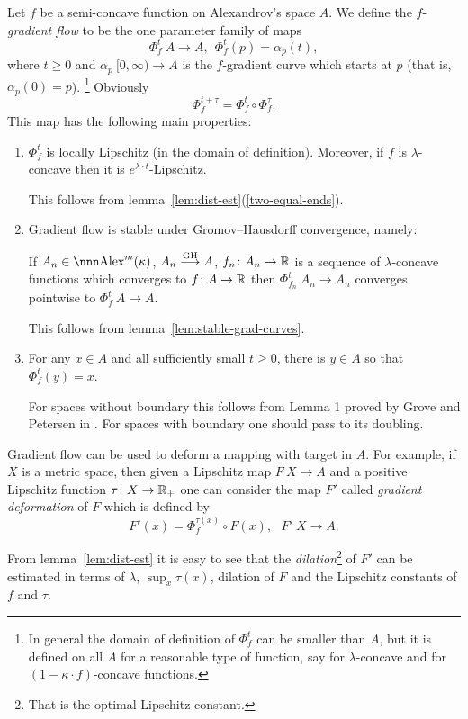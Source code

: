 \documentclass{article}
\begin{document}
Let $f$ be a semi-concave function on Alexandrov's space $A$. 
We define the $f$-\emph{gradient flow} to be the one parameter family of maps 
$$\Phi^t_f\:A\to A, \ \ \Phi^t_f(p)=\alpha_p(t),$$
where $t\ge 0$ and $\alpha_p\:[0,\infty)\to A$ is the $f$-gradient curve which
starts at $p$ (that is, $\alpha_p(0)=p$).
\footnote{In general the domain of definition of $\Phi^t_f$ can be smaller than $A$, 
but it is defined on all $A$ for a reasonable type of function, say for $\lambda$-concave and for $(1-\kappa{\cdot}f)$-concave functions.}
Obviously
$$ \Phi^{t+\tau}_f=\Phi^t_f\circ\Phi^\tau_f.$$
This map has the following main properties:
\begin{enumerate}
\item $\Phi^t_f$ is locally Lipschitz (in the domain of definition). 
Moreover, if $f$ is $\lambda$-concave then it is $e^{\lambda{\cdot}t}$-Lipschitz.

This follows from lemma~\ref{lem:dist-est}(\ref{two-equal-ends}).

\item Gradient flow is stable under Gromov--Hausdorff convergence, namely:

If $A_n\in \Alex^m(\kappa)$, $A_n\GHto A$, $f_n\colon A_n\to\mathbb{R}$ is a sequence of
$\lambda$-concave functions which converges to $f\colon A\to \mathbb{R}$ then
$\Phi_{f_n}^t\:A_n\to A_n$ converges pointwise to $\Phi_f^t\:A\to A$.

This follows  from lemma~\ref{lem:stable-grad-curves}.

\item\label{grad-onto} For any $x\in A$ and all sufficiently small $t\ge 0$, there is $y\in A$ so that 
$\Phi_f^t(y)=x$.

For spaces without boundary this follows from Lemma 1 proved by Grove and Petersen in \cite{grove-petersen:rad-sphere}.
For spaces with boundary one should pass to its doubling.
\end{enumerate}


Gradient flow can be used to deform a mapping with target in $A$. 
For example, if $X$ is a metric space, then given a Lipschitz map $F\:X\to A$ and
a positive Lipschitz function $\tau\colon X\to \mathbb{R}_+$ one can consider the map $F'$ called
\emph{gradient deformation} of $F$ which is defined by
$$F'(x)=\Phi_f^{\tau(x)}\circ F(x),\ \ \ F'\:X\to A.$$

From lemma~\ref{lem:dist-est} it is easy to see that the \emph{dilation}\footnote{That is the optimal Lipschitz constant.}
of $F'$
can be estimated in terms of $\lambda$, $\sup_x\tau(x)$, dilation of $F$ and the
Lipschitz constants of $f$ and $\tau$.
\end{document}
